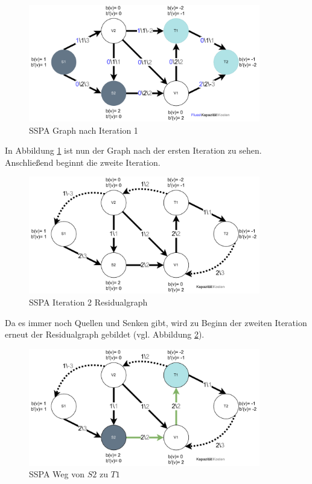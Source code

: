\begin{figure}[H]
\centering
\includegraphics[width=0.9\textwidth]{img/anton/sspa-Step1-newGraph.pdf}
\caption{SSPA Graph nach Iteration 1}
\label{fig:sspa_step1-new-Graph}
\end{figure}

In Abbildung \ref{fig:sspa_step1-new-Graph} ist nun der Graph nach der ersten Iteration zu sehen. Anschließend beginnt die zweite Iteration.

\begin{figure}[H]
\centering
\includegraphics[width=0.9\textwidth]{img/anton/sspa-Step2-residual.pdf}
\caption{SSPA Iteration 2 Residualgraph}
\label{fig:sspa_step2-residual}
\end{figure}

Da es immer noch Quellen und Senken gibt, wird zu Beginn der zweiten Iteration erneut der Residualgraph gebildet (vgl. Abbildung \ref{fig:sspa_step2-residual}).

\begin{figure}[H]
\centering
\includegraphics[width=0.9\textwidth]{img/anton/sspa-Step2-shortestPath.pdf}
\caption{SSPA Weg von $S2$ zu $T1$}
\label{fig:sspa_step2-shortestPath}
\end{figure}

